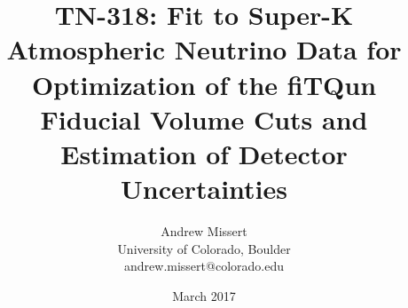 \documentclass[12pt]{article}
\begin{document}
\title{TN-318: Fit to Super-K Atmospheric Neutrino Data for Optimization of the fiTQun Fiducial
Volume Cuts and Estimation of Detector Uncertainties}
\author{Andrew Missert\\University of Colorado, Boulder\\andrew.missert@colorado.edu}
\date{March 2017}
\maketitle




\FloatBarrier


\FloatBarrier



\FloatBarrier



\FloatBarrier

%

\FloatBarrier


\FloatBarrier

\appendix







{}




\end{document}
